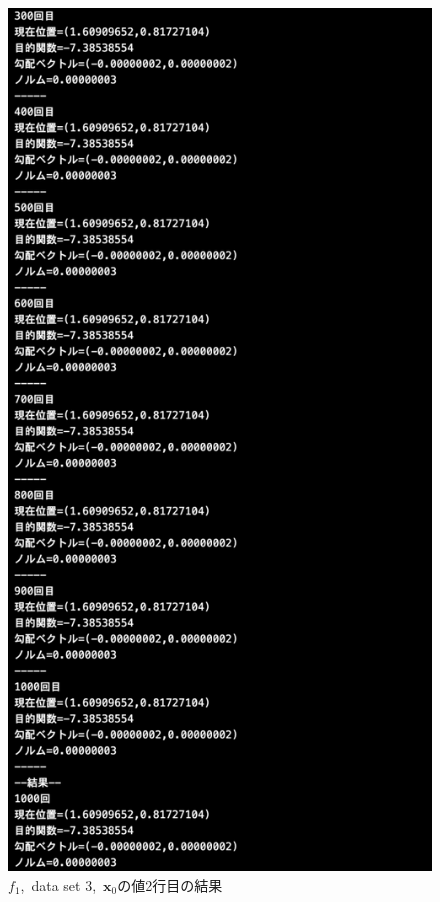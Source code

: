 \documentclass[12pt]{jarticle}
\begin{document}
\begin{figure}[h]
\begin{minipage}{0.5\hsize}
    \end{minipage}
    \begin{minipage}{0.5\hsize}
        \begin{center}
            \includegraphics[scale=0.2]{kadai1_1s_out3_2_3.png}
        \end{center}
    \end{minipage}
    \caption{$f_1$,\ data set 3,\ $\boldsymbol{x}_0$の値2行目の結果}
\end{figure}
\end{document}

